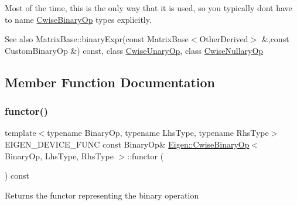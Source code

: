 Most of the time, this is the only way that it is used, so you typically don\textquotesingle{}t have to name \mbox{\hyperlink{class_eigen_1_1_cwise_binary_op}{Cwise\+Binary\+Op}} types explicitly.

\begin{DoxySeeAlso}{See also}
Matrix\+Base\+::binary\+Expr(const Matrix\+Base$<$\+Other\+Derived$>$ \&,const Custom\+Binary\+Op \&) const, class \mbox{\hyperlink{class_eigen_1_1_cwise_unary_op}{Cwise\+Unary\+Op}}, class \mbox{\hyperlink{class_eigen_1_1_cwise_nullary_op}{Cwise\+Nullary\+Op}} 
\end{DoxySeeAlso}


\subsection{Member Function Documentation}
\mbox{\label{class_eigen_1_1_cwise_binary_op_acc4efe306adbdc0c95cc1c73a8cf81e4}} 
\subsubsection{\texorpdfstring{functor()}{functor()}}
{\footnotesize\ttfamily template$<$typename Binary\+Op, typename Lhs\+Type, typename Rhs\+Type$>$ \\
E\+I\+G\+E\+N\+\_\+\+D\+E\+V\+I\+C\+E\+\_\+\+F\+U\+NC const Binary\+Op\& \mbox{\hyperlink{class_eigen_1_1_cwise_binary_op}{Eigen\+::\+Cwise\+Binary\+Op}}$<$ Binary\+Op, Lhs\+Type, Rhs\+Type $>$\+::functor (\begin{DoxyParamCaption}{ }\end{DoxyParamCaption}) const\hspace{0.3cm}{\ttfamily [inline]}}

\begin{DoxyReturn}{Returns}
the functor representing the binary operation 
\end{DoxyReturn}
\mbox{\label{class_eigen_1_1_cwise_binary_op_a0f73e7585dfb54d41c1983e1e6a4b269}} 
